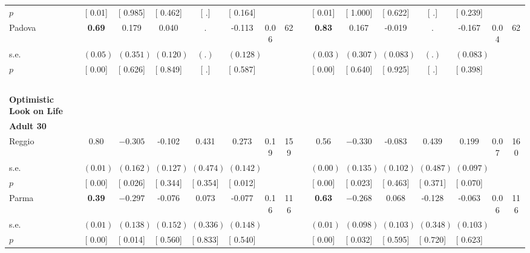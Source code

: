 \begin{longtable}{L{8em} c c c c c c c p{1em} c c c c c c c}
\quad \quad \quad \quad $ p$ & [     0.01] & [    0.985] & [    0.462] & [        .] & [    0.164] & & & & [     0.01] & [    1.000] & [    0.622] & [        .] & [    0.239] & &  \\[1em]
\quad \quad \quad Padova& \textbf{     0.69} &     0.179 &     0.040 &         . &    -0.113 &      0.06 &        62 & & \textbf{     0.83} &     0.167 &    -0.019 &         . &    -0.167 &      0.04 &        62  \\*
\quad \quad \quad \quad s.e.& $ (     0.05)$ & $ (    0.351)$ & $ (    0.120)$ & $ (        .)$ & $ (    0.128)$ & & & & $ (     0.03)$ & $ (    0.307)$ & $ (    0.083)$ & $ (        .)$ & $ (    0.083)$ & &  \\*
\quad \quad \quad \quad $ p$ & [     0.00] & [    0.626] & [    0.849] & [        .] & [    0.587] & & & & [     0.00] & [    0.640] & [    0.925] & [        .] & [    0.398] & &  \\[1em]
~\\[1em]
\textbf{Optimistic Look on Life} \\*
\quad \quad \textbf{Adult 30} & & & & & & & & & & & & & & & \\* 
\quad \quad \quad Reggio& 0.80 & $ \mathbf{   -0.305}$ &    -0.102 &     0.431 & $ \mathbf{    0.273}$ &      0.19 &       159 & & 0.56 & $ \mathbf{   -0.330}$ &    -0.083 &     0.439 & $ \mathbf{    0.199}$ &      0.07 &       160  \\*
\quad \quad \quad \quad s.e.& $ (     0.01)$ & $ (    0.162)$ & $ (    0.127)$ & $ (    0.474)$ & $ (    0.142)$ & & & & $ (     0.00)$ & $ (    0.135)$ & $ (    0.102)$ & $ (    0.487)$ & $ (    0.097)$ & &  \\*
\quad \quad \quad \quad $ p$ & [     0.00] & [    0.026] & [    0.344] & [    0.354] & [    0.012] & & & & [     0.00] & [    0.023] & [    0.463] & [    0.371] & [    0.070] & &  \\[1em]
\quad \quad \quad Parma& \textbf{     0.39} & $ \mathbf{   -0.297}$ &    -0.076 &     0.073 &    -0.077 &      0.16 &       116 & & \textbf{     0.63} & $ \mathbf{   -0.268}$ &     0.068 &    -0.128 &    -0.063 &      0.06 &       116  \\*
\quad \quad \quad \quad s.e.& $ (     0.01)$ & $ (    0.138)$ & $ (    0.152)$ & $ (    0.336)$ & $ (    0.148)$ & & & & $ (     0.01)$ & $ (    0.098)$ & $ (    0.103)$ & $ (    0.348)$ & $ (    0.103)$ & &  \\*
\quad \quad \quad \quad $ p$ & [     0.00] & [    0.014] & [    0.560] & [    0.833] & [    0.540] & & & & [     0.00] & [    0.032] & [    0.595] & [    0.720] & [    0.623] & &  \\[1em]

\end{longtable}
